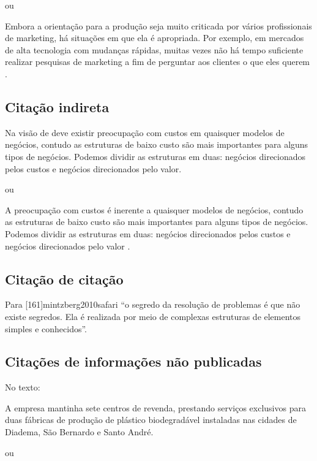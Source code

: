 ou

\begin{citacao}
Embora a orientação para a produção seja muito criticada
por vários profissionais de marketing, há situações em
que ela é apropriada. Por exemplo, em mercados de alta
tecnologia com mudanças rápidas, muitas vezes não há
tempo suficiente realizar pesquisas de marketing a fim de
perguntar aos clientes o que eles querem \parencite{churchill2012marketing}.
\end{citacao}

\subsection{Citação indireta}

Na visão de \textcite{osterwalder2011business} deve existir preocupação
com custos em quaisquer modelos de negócios, contudo as estruturas de baixo
custo são mais importantes para alguns tipos de negócios. Podemos dividir as
estruturas em duas: negócios direcionados pelos custos e negócios direcionados
pelo valor.

ou

A preocupação com custos é inerente a quaisquer modelos de negócios, contudo
as estruturas de baixo custo são mais importantes para alguns tipos de negócios.
Podemos dividir as estruturas em duas: negócios direcionados pelos custos e negócios
direcionados pelo valor \parencite{osterwalder2011business}.

\subsection{Citação de citação}

Para [161]{mintzberg2010safari}  “o segredo da
resolução de problemas é que não existe segredos. Ela é realizada por meio de
complexas estruturas de elementos simples e conhecidos”.

\subsection{Citações de informações não publicadas}

No texto:

A empresa mantinha sete centros de revenda, prestando serviços exclusivos para duas
fábricas de produção de plástico biodegradável instaladas nas cidades de Diadema, São
Bernardo e Santo André.

ou

